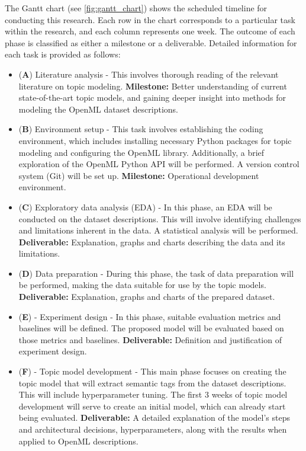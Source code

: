 \documentclass{article}
\begin{document}
The Gantt chart (see \cref{fig:gantt_chart}) shows the scheduled timeline for conducting this research. Each row in the chart corresponds to a particular task within the research, and each column represents one week. The outcome of each phase is classified as either a milestone or a deliverable. Detailed information for each task is provided as follows:

\begin{itemize}
    \item (\textbf{A}) Literature analysis - This involves thorough reading of the relevant literature on topic modeling. \textbf{Milestone:} Better understanding of current state-of-the-art topic models, and gaining deeper insight into methods for modeling the OpenML dataset descriptions.

    \item (\textbf{B}) Environment setup - This task involves establishing the coding environment, which includes installing necessary Python packages for topic modeling and configuring the OpenML library. Additionally, a brief exploration of the OpenML Python API will be performed. A version control system (Git) will be set up. \textbf{Milestone:} Operational development environment.

    \item (\textbf{C}) Exploratory data analysis (EDA) - In this phase, an EDA will be conducted on the dataset descriptions. This will involve identifying challenges and limitations inherent in the data. A statistical analysis will be performed. \textbf{Deliverable:} Explanation, graphs and charts describing the data and its limitations.

    \item (\textbf{D}) Data preparation - During this phase, the task of data preparation will be performed, making the data suitable for use by the topic models. \textbf{Deliverable:} Explanation, graphs and charts of the prepared dataset.

    \item (\textbf{E}) - Experiment design - In this phase, suitable evaluation metrics and baselines will be defined. The proposed model will be evaluated based on those metrics and baselines. \textbf{Deliverable:} Definition and justification of experiment design.

    \item (\textbf{F}) - Topic model development - This main phase focuses on creating the topic model that will extract semantic tags from the dataset descriptions. This will include hyperparameter tuning. The first 3 weeks of topic model development will serve to create an initial model, which can already start being evaluated. \textbf{Deliverable:} A detailed explanation of the model's steps and architectural decisions, hyperparameters, along with the results when applied to OpenML descriptions.


\end{itemize}
\end{document}
